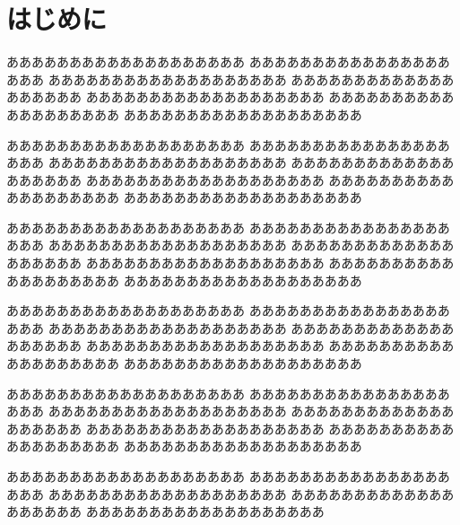 \section{はじめに}
あああああああああああああああああああ
あああああああああああああああああああ
あああああああああああああああああああ
あああああああああああああああああああ
あああああああああああああああああああ
あああああああああああああああああああ
あああああああああああああああああああ

あああああああああああああああああああ
あああああああああああああああああああ
あああああああああああああああああああ
あああああああああああああああああああ
あああああああああああああああああああ
あああああああああああああああああああ
あああああああああああああああああああ

あああああああああああああああああああ
あああああああああああああああああああ
あああああああああああああああああああ
あああああああああああああああああああ
あああああああああああああああああああ
あああああああああああああああああああ
あああああああああああああああああああ

あああああああああああああああああああ
あああああああああああああああああああ
あああああああああああああああああああ
あああああああああああああああああああ
あああああああああああああああああああ
あああああああああああああああああああ
あああああああああああああああああああ

あああああああああああああああああああ
あああああああああああああああああああ
あああああああああああああああああああ
あああああああああああああああああああ
あああああああああああああああああああ
あああああああああああああああああああ
あああああああああああああああああああ

あああああああああああああああああああ
あああああああああああああああああああ
あああああああああああああああああああ
あああああああああああああああああああ
あああああああああああああああああああ

